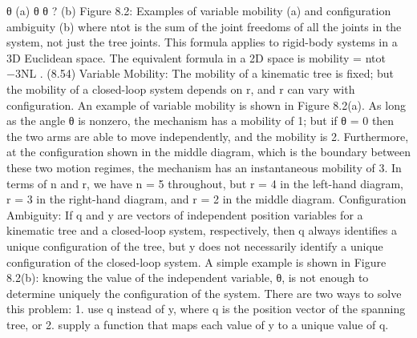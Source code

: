 θ (a) θ θ ? (b) Figure 8.2: Examples of variable mobility (a) and configuration ambiguity (b) where ntot is the sum of the joint freedoms of all the joints in the system, not just the tree joints. This formula applies to rigid-body systems in a 3D Euclidean space. The equivalent formula in a 2D space is mobility = ntot −3NL . (8.54) Variable Mobility: The mobility of a kinematic tree is fixed; but the mobility of a closed-loop system depends on r, and r can vary with configuration. An example of variable mobility is shown in Figure 8.2(a). As long as the angle θ is nonzero, the mechanism has a mobility of 1; but if θ = 0 then the two arms are able to move independently, and the mobility is 2. Furthermore, at the configuration shown in the middle diagram, which is the boundary between these two motion regimes, the mechanism has an instantaneous mobility of 3. In terms of n and r, we have n = 5 throughout, but r = 4 in the left-hand diagram, r = 3 in the right-hand diagram, and r = 2 in the middle diagram. Configuration Ambiguity: If q and y are vectors of independent position variables for a kinematic tree and a closed-loop system, respectively, then q always identifies a unique configuration of the tree, but y does not necessarily identify a unique configuration of the closed-loop system. A simple example is shown in Figure 8.2(b): knowing the value of the independent variable, θ, is not enough to determine uniquely the configuration of the system. There are two ways to solve this problem: 1. use q instead of y, where q is the position vector of the spanning tree, or 2. supply a function that maps each value of y to a unique value of q.

